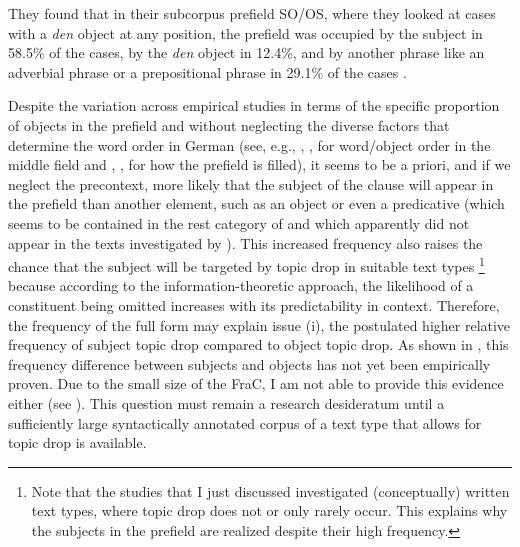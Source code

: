 %
They found that in their subcorpus prefield SO/OS, where they looked at cases with a \textit{den} object at any position, the prefield was occupied by the subject in 58.5\% of the cases, by the \textit{den} object in 12.4\%, and by another phrase like an adverbial  phrase or a prepositional phrase in 29.1\% of the cases \citep[725]{bader.haeussler2010}.

Despite the variation across empirical studies in terms of the specific proportion of objects in the prefield and without neglecting the diverse factors that determine the word order in German (see, e.g., \cite{hoberg1981}, \cite{kempen.harbusch2005},  \cite{rauth2020} for word/object order in the middle field  and \cite{speyer2007}, \cite{filippova.strube2007}, \cite{bader.etal2017} for how the prefield is filled), it seems to be a priori, and if we neglect the precontext, more likely that the subject of the clause will appear in the prefield than another element, such as an object or even a predicative (which seems to be contained in the rest category of \cite{hansen-schirra.gutermuth2017} and which apparently did not appear in the texts investigated by \cite{zybatow2014}).
This increased frequency also raises the chance that the subject will be targeted by topic drop in suitable text types%
\footnote{Note that the studies that I just discussed investigated (conceptually) written text types,  where topic drop does not or only rarely occur.
This explains why the subjects in the prefield are realized despite their high frequency.} 
%
because according to the information-theoretic approach, the likelihood of a constituent being omitted increases with its predictability in context. 
Therefore, the frequency of the full form may explain issue (i), the postulated higher relative frequency of subject topic drop compared to object topic drop.
As shown in , this frequency difference between subjects and objects has not yet been empirically proven.
Due to the small size of the FraC, I am not able to provide this evidence either (see ).
This question must remain a research desideratum until a sufficiently large syntactically annotated corpus of a text type that allows for topic drop is available.

